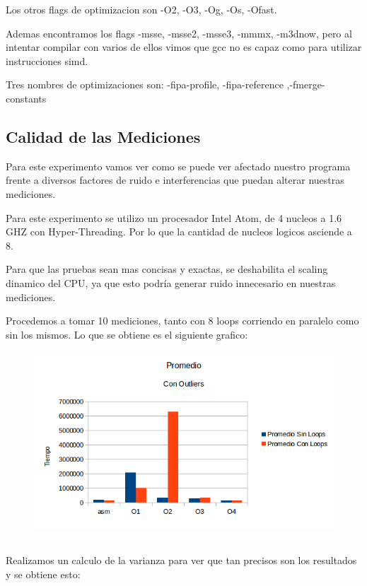 \documentclass[a4paper]{article}
\begin{document}
Los otros flags de optimizacion son -O2, -O3, -Og, -Os, -Ofast.

Ademas encontramos los flags -msse, -msse2, -msse3, -mmmx, -m3dnow, pero al intentar compilar con varios de ellos vimos que gcc no es capaz como para utilizar instrucciones simd.

Tres nombres de optimizaciones son: -fipa-profile, -fipa-reference ,-fmerge-constants 

\newpage
\subsection{Calidad de las Mediciones}
Para este experimento vamos ver como se puede ver afectado nuestro programa frente a diversos factores de ruido e interferencias que puedan alterar nuestras mediciones.

Para este experimento se utilizo un procesador Intel Atom, de 4 nucleos a 1.6 GHZ con Hyper-Threading. Por lo que la cantidad de nucleos logicos asciende a 8.

Para que las pruebas sean mas concisas y exactas, se deshabilita el scaling dinamico del CPU, ya que esto podría generar ruido innecesario en nuestras mediciones.

Procedemos a tomar 10 mediciones, tanto con 8 loops corriendo en paralelo como sin los mismos. Lo que se obtiene es el siguiente grafico:
\\
\begin{figure}[h!]
  \begin{center}
	\includegraphics[scale=0.66]{GraficosTesting/crop/PCO.png}
	\label{nombreparareferenciar1}
  \end{center}
\end{figure}
\\
Realizamos un calculo de la varianza para ver que tan precisos son los resultados y se obtiene esto:
\end{document}
